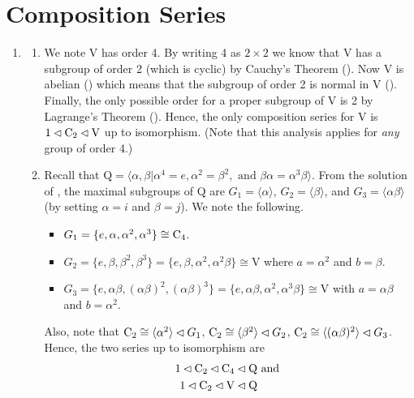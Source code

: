 \section{Composition Series}
\begin{enumerate}
    \item \begin{enumerate}[label=(\roman*)]
        \item We note $\mathrm{V}$ has order 4. By writing 4 as $2 \times 2$ we know that $\mathrm{V}$ has a subgroup of order 2 (which is cyclic) by Cauchy's Theorem (). Now $\mathrm{V}$ is abelian () which means that the subgroup of order 2 is normal in $\mathrm{V}$ (). Finally, the only possible order for a proper subgroup of $\mathrm{V}$ is 2 by Lagrange's Theorem (). Hence, the only composition series for $\mathrm{V}$ is $1 \lhd \mathrm{C}_{2} \lhd \mathrm{V}$ up to isomorphism.\newline
        (Note that this analysis applies for \textit{any} group of order 4.)
        
        \item Recall that $\mathrm{Q} = \langle \alpha, \beta \vert \alpha^4 = e, \alpha^2 = \beta^2, \text{ and } \beta\alpha = \alpha^3\beta \rangle$. From the solution of , the maximal subgroups of $\mathrm{Q}$ are $G_1 = \langle \alpha \rangle$, $G_2 = \langle \beta \rangle$, and $G_3 = \langle \alpha\beta \rangle$ (by setting $\alpha = i$ and $\beta = j$). We note the following.
        \begin{itemize}
            \item $G_1 = \{e, \alpha, \alpha^2, \alpha^3\} \cong \mathrm{C}_{4}$.
            \item $G_2 = \{e, \beta, \beta^2, \beta^3\} = \{e, \beta, \alpha^2, \alpha^2\beta\} \cong \mathrm{V}$ where $a = \alpha^2$ and $b = \beta$.
            \item $G_3 = \{e, \alpha\beta, (\alpha\beta)^2, (\alpha\beta)^3\} = \{e, \alpha\beta, \alpha^2, \alpha^3\beta\} \cong \mathrm{V}$ with $a = \alpha\beta$ and $b = \alpha^2$.
        \end{itemize}
        Also, note that $\mathrm{C}_{2} \cong \langle \alpha^2 \rangle \lhd G_1$, $\mathrm{C}_{2} \cong \langle \beta^2 \rangle \lhd G_2$, $\mathrm{C}_{2} \cong \langle (\alpha\beta)^2 \rangle \lhd G_3$. Hence, the two series up to isomorphism are 
        \begin{align*}
            1 \lhd \mathrm{C}_{2} \lhd \mathrm{C}_{4} \lhd \mathrm{Q} & \text{ and }\\
            1 \lhd \mathrm{C}_{2} \lhd \mathrm{V} \lhd \mathrm{Q}
        \end{align*}
        

\end{enumerate}
\end{enumerate}
